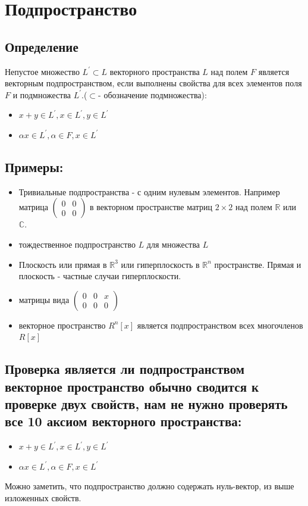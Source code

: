 \documentclass[12pt]{article}
\begin{document}
\section{Подпространство}
\subsection{Определение}
Непустое множество $L^{'} \subset L$ векторного пространства $L$ над полем $F$ является векторным подпространством, если выполнены свойства для всех элементов поля $F$ и подмножества $L^{'}$.($\subset$- обозначение подмножества):
\begin{itemize}
    \item $x+y\in L^{'} , x \in L^{'}, y \in L^{'} $
    \item $\alpha x \in L^{'}, \alpha \in F, x \in L^{'}$
\end{itemize}

\subsection{Примеры:}
\begin{itemize}
    \item Тривиальные подпространства - с одним нулевым элементов. Например матрица $\begin{pmatrix}
                  0 & 0 \\
                  0 & 0
              \end{pmatrix}$
          в векторном пространстве матриц $2\times 2$ над полем $\mathbb{R}$ или $\mathbb{C}$.
    \item тождественное подпространство $L$ для множества $L$
    \item Плоскость или прямая в $\mathbb{R}^3$ или гиперплоскость в $\mathbb{R}^n$ пространстве. Прямая и плоскость - частные случаи гиперплоскости.
    \item матрицы вида $\begin{pmatrix}
                  0 & 0 & x \\
                  0 & 0 & 0
              \end{pmatrix}$
    \item векторное пространство $ R^n[x]$ является подпространством всех многочленов $R[x]$
\end{itemize}
\subsection{Проверка является ли подпространством векторное пространство обычно сводится к проверке двух свойств, нам не нужно проверять все 10 аксиом векторного пространства: }
\begin{itemize}
    \item $x+y\in L^{'} , x \in L^{'}, y \in L^{'} $
    \item $\alpha x \in L^{'}, \alpha \in F, x \in L^{'}$

\end{itemize}
Можно заметить, что подпространство должно содержать нуль-вектор, из выше изложенных свойств.
\end{document}
